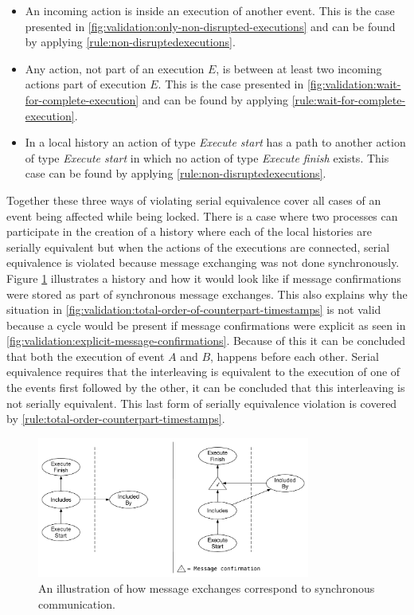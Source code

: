 	\begin{itemize}
		\item An incoming action is inside an execution of another event. This is the case presented in \autoref{fig:validation:only-non-disrupted-executions} and can be found by applying \autoref{rule:non-disruptedexecutions}.
		\item Any action, not part of an execution $E$, is between at least two incoming actions part of execution $E$. This is the case presented in \autoref{fig:validation:wait-for-complete-execution} and can be found by applying \autoref{rule:wait-for-complete-execution}.
		\item In a local history an action of type \textit{Execute start} has a path to another action of type \textit{Execute start} in which no action of type \textit{Execute finish} exists. This case can be found by applying \autoref{rule:non-disruptedexecutions}.
	\end{itemize}
	
	Together these three ways of violating serial equivalence cover all cases of an event being affected while being locked. There is a case where two processes can participate in the creation of a history where each of the local histories are serially equivalent but when the actions of the executions are connected, serial equivalence is violated because message exchanging was not done synchronously. Figure \ref{fig:validation:synchronous-execution} illustrates a history and how it would look like if message confirmations were stored as part of synchronous message exchanges. This also explains why the situation in \autoref{fig:validation:total-order-of-counterpart-timestamps} is not valid because a cycle would be present if message confirmations were explicit as seen in \autoref{fig:validation:explicit-message-confirmations}. Because of this it can be concluded that both the execution of event $A$ and $B$, happens before each other. Serial equivalence requires that the interleaving is equivalent to the execution of one of the events first followed by the other, it can be concluded that this interleaving is not serially equivalent. This last form of serially equivalence violation is covered by \autoref{rule:total-order-counterpart-timestamps}.
	
	\begin{figure}[H]
		\centering
		\includegraphics[width=0.8\textwidth]{6validation/images/synchronous-execution.pdf}
		\caption{An illustration of how message exchanges correspond to synchronous communication.}
		\label{fig:validation:synchronous-execution}
	\end{figure}
	
